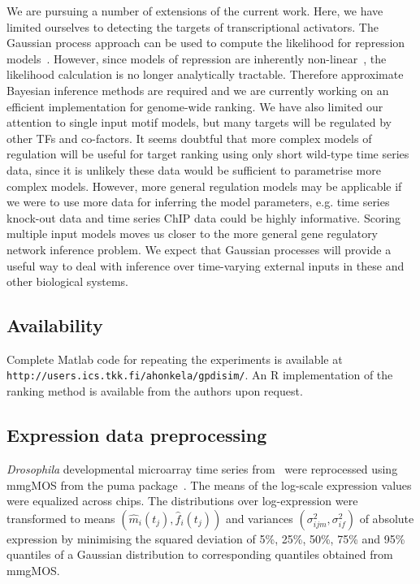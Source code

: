 \documentclass{pnastwo}
\begin{document}
\begin{article}
We are pursuing a number of extensions of the current work. Here, we
have limited ourselves to detecting the targets of transcriptional activators. The
Gaussian process approach can be used to compute the likelihood for
repression models~\cite{Gao2008}. However, since models of repression
are inherently non-linear~\cite{Khanin2006}, the likelihood calculation is no longer analytically
tractable. Therefore approximate Bayesian inference methods are
required and we are currently working on an efficient implementation
for genome-wide ranking. We have also limited our attention
to single input motif models, but many targets will be regulated by other TFs and
co-factors. It seems doubtful that more complex models of regulation
will be useful for target ranking using only short wild-type time
series data, since it is unlikely these data would be sufficient to parametrise more complex models. However,
more general regulation models may be applicable if we were to use more data for
inferring the model parameters, e.g. time series knock-out data and time series
ChIP data could be highly informative. Scoring multiple input
models moves us closer to the more general gene regulatory network inference
problem. We expect that Gaussian processes will provide a useful way
to deal with inference over time-varying external inputs in these and other
biological systems.

\subsection{Availability}
Complete Matlab code for repeating the experiments is available at
\texttt{http://users.ics.tkk.fi/ahonkela/gpdisim/}.
An R implementation of
the ranking method is available from the authors upon request.

\begin{materials}
  \section{Expression data preprocessing} {\it Drosophila} developmental
  microarray time series from~\cite{Tomancak2002} were reprocessed
  using mmgMOS from the puma package~\cite{Pearson2009}.  The means of
  the log-scale expression values were equalized across chips.  The
  distributions over log-expression were transformed to means
  $\left(\hat{m}_i(t_j), \hat{f}_i(t_j)\right)$ and variances $\left(\sigma_{ijm}^2,
  \sigma_{if}^2 \right)$ of absolute expression by minimising the squared
  deviation of 5\%, 25\%, 50\%, 75\% and 95\% quantiles of a Gaussian
  distribution to corresponding quantiles obtained from mmgMOS.


\end{materials}
\end{article}
\end{document}
